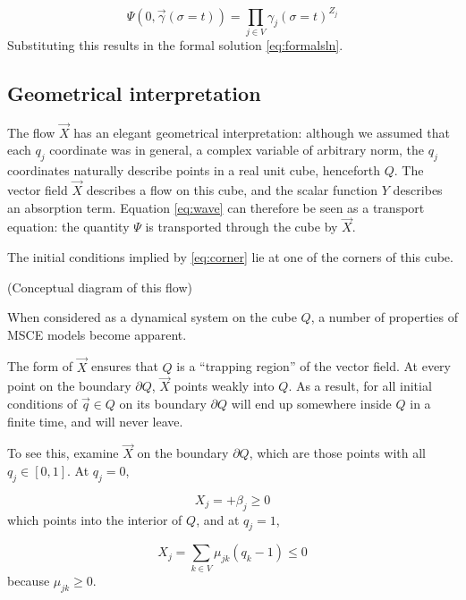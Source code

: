 \documentclass{article}
\begin{document}
\begin{equation}
    \Psi(0, \vec{\gamma}(\sigma=t)) = \prod_{j \in V} \gamma_j(\sigma=t)^{Z_j}
\end{equation}
Substituting this results in the formal solution \eqref{eq:formalsln}.


\subsection{Geometrical interpretation}

The flow $\vec{X}$ has an elegant geometrical interpretation: although we
assumed that each $q_j$ coordinate was in general, a complex variable of
arbitrary norm, the $q_j$ coordinates naturally describe points in a real unit
cube, henceforth $Q$. The vector field $\vec{X}$ describes a flow on this cube, and the
scalar function $Y$ describes an absorption term. Equation \eqref{eq:wave} can
therefore be seen as a transport equation: the quantity $\Psi$ is transported
through the cube by $\vec{X}$.

The initial conditions implied by \eqref{eq:corner} lie at one of the corners of
this cube.

(Conceptual diagram of this flow)

When considered as a dynamical system on the cube $Q$, a number of properties
of MSCE models become apparent.

The form of $\vec{X}$ ensures that $Q$ is a ``trapping region'' of the
vector field. At every point on the boundary $\partial Q$, $\vec{X}$ points weakly
into $Q$. As a result, for all initial conditions of $\vec{q} \in Q$ on its
boundary $\partial Q$ will end up somewhere inside $Q$ in a finite time, and will never leave.

To see this, examine $\vec{X}$ on the boundary $\partial Q$, which are those
points with all $q_j \in [0, 1]$. At $q_j = 0$,

\begin{equation*}
    X_j = +\beta_j \geq 0
\end{equation*}
which points into the interior of $Q$, and at $q_j = 1$,

\begin{equation*}
    X_j = \sum_{k \in V} \mu_{jk} (q_k - 1) \leq 0
\end{equation*}
because $\mu_{jk} \geq 0$.
\end{document}
